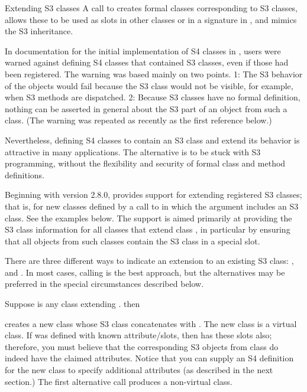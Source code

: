 %
\begin{Section}{Extending S3 classes}
A call to  creates formal classes corresponding
to S3 classes, allows these to be used as slots in other classes or in
a signature in , and mimics the S3
inheritance.

In documentation for the initial implementation of S4 classes in \R{},
users were warned against defining S4 classes that contained S3
classes, even if those had been registered.  The warning was based
mainly on two points.  1: The S3 behavior of the objects would fail
because the S3 class would not be visible, for example, when S3
methods are dispatched.  2: Because S3 classes have no formal
definition, nothing can be asserted in general about the S3 part of
an object from such a class.  (The warning was repeated as recently
as the first reference below.)

Nevertheless, defining S4 classes to contain an S3 class and extend
its behavior is attractive in many applications.  The alternative is
to be stuck with S3 programming, without the flexibility and security of
formal class and method definitions.

Beginning with version 2.8.0, \R{} provides support for extending
registered S3 classes; that is, for new classes defined by a call to
 in which the  argument
includes an S3 class.  See the examples below.  The support is aimed
primarily at providing the S3 class information for all classes that
extend class , in particular by ensuring that
all objects from such classes contain the S3 class in a special
slot.

There are three different ways to indicate an extension to an existing
S3 class:  ,   and
.  In most cases, calling  is the
best approach,  but the alternatives may be preferred in the special
circumstances described below.

Suppose  is any class extending . then


creates a new class  whose S3 class
concatenates   with .  The new class is a
virtual class.  If  was defined with known attribute/slots,
then  has these slots also; therefore, you must believe that
the corresponding S3 objects from class  do indeed have the
claimed attributes.  Notice that you can supply an S4 definition for the
new class to specify additional attributes (as described in the next
section.)
The first alternative call produces a non-virtual  class.


\end{Section}
